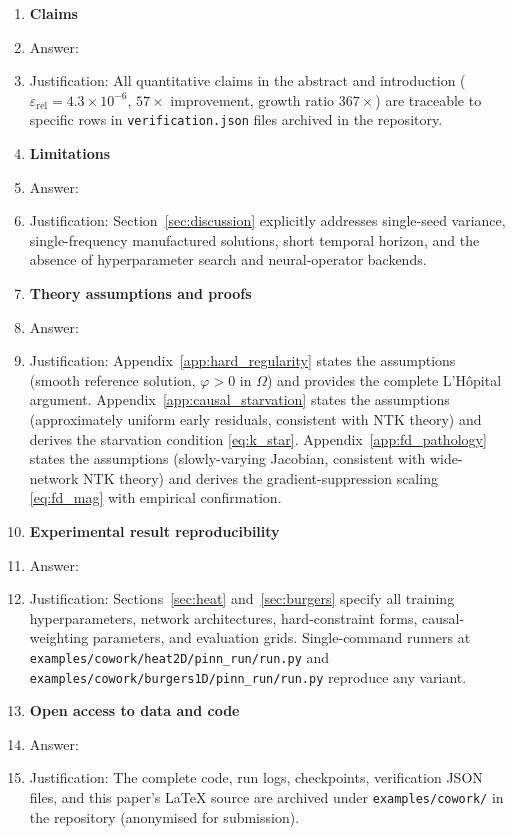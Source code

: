 \documentclass{article}
\newcommand{\relL}{\varepsilon_{\mathrm{rel}}}
\begin{document}
\begin{enumerate}

\item \textbf{Claims}
  \item[] Answer: \answerYes{}
  \item[] Justification: All quantitative claims in the abstract and introduction
    ($\relL = 4.3\times10^{-6}$, $57\times$ improvement, growth ratio $367\times$)
    are traceable to specific rows in \texttt{verification.json} files archived in
    the repository.

\item \textbf{Limitations}
  \item[] Answer: \answerYes{}
  \item[] Justification: Section~\ref{sec:discussion} explicitly addresses
    single-seed variance, single-frequency manufactured solutions, short temporal
    horizon, and the absence of hyperparameter search and neural-operator backends.

\item \textbf{Theory assumptions and proofs}
  \item[] Answer: \answerYes{}
  \item[] Justification:
    Appendix~\ref{app:hard_regularity} states the assumptions (smooth reference
    solution, $\varphi > 0$ in $\Omega$) and provides the complete L'H\^opital argument.
    Appendix~\ref{app:causal_starvation} states the assumptions (approximately
    uniform early residuals, consistent with NTK theory) and derives the starvation
    condition \eqref{eq:k_star}.
    Appendix~\ref{app:fd_pathology} states the assumptions (slowly-varying Jacobian,
    consistent with wide-network NTK theory) and derives the gradient-suppression
    scaling \eqref{eq:fd_mag} with empirical confirmation.

\item \textbf{Experimental result reproducibility}
  \item[] Answer: \answerYes{}
  \item[] Justification: Sections~\ref{sec:heat} and~\ref{sec:burgers} specify
    all training hyperparameters, network architectures, hard-constraint forms,
    causal-weighting parameters, and evaluation grids.
    Single-command runners at \texttt{examples/cowork/heat2D/pinn\_run/run.py}
    and \texttt{examples/cowork/burgers1D/pinn\_run/run.py} reproduce any variant.

\item \textbf{Open access to data and code}
  \item[] Answer: \answerYes{}
  \item[] Justification: The complete code, run logs, checkpoints, verification
    JSON files, and this paper's \LaTeX{} source are archived under
    \texttt{examples/cowork/} in the repository (anonymised for submission).


\end{enumerate}
\end{document}
